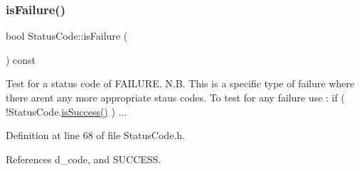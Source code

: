 \subsubsection{\texorpdfstring{is\+Failure()}{isFailure()}}
{\footnotesize\ttfamily bool Status\+Code\+::is\+Failure (\begin{DoxyParamCaption}{ }\end{DoxyParamCaption}) const\hspace{0.3cm}{\ttfamily [inline]}}

Test for a status code of F\+A\+I\+L\+U\+RE. N.\+B. This is a specific type of failure where there aren\textquotesingle{}t any more appropriate staus codes. To test for any failure use \+: if ( !\+Status\+Code.\hyperlink{classStatusCode_acfe5ce8b2bb7d3d651fb0108c18c05c3}{is\+Success()} ) ... 

Definition at line 68 of file Status\+Code.\+h.



References d\+\_\+code, and S\+U\+C\+C\+E\+SS.



